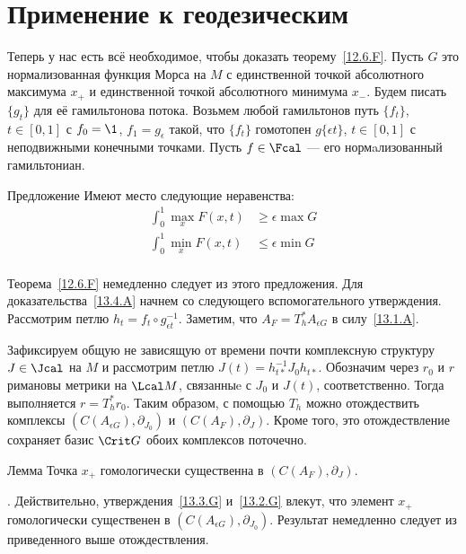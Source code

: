 \section{Применение к геодезическим}\label{sec:13.4}
Теперь у нас есть всё необходимое, чтобы доказать теорему~\ref{12.6.F}.
Пусть $G$ это нормализованная функция Морса на $M$ с единственной точкой абсолютного максимума $x_{+}$ и единственной точкой абсолютного минимума $x_{-}$.
Будем писать $\{g_{t}\}$ для её гамильтонова потока.
Возьмем любой гамильтонов путь $\{f_{t}\}$, $t\in[0,1]$ с $f_{0}=\1$,
$f_{1}=g_{\epsilon}$ такой, что $\{f_{t}\}$ гомотопен $g\{\epsilon
t\}$, $t\in[0,1]$ с неподвижными конечными точками.
Пусть $f\in\Fcal$ --- его нормaлизованный гамильтониан.
\begin{thm}{Предложение}\label{13.4.A}
  Имеют место следующие неравенства:
  \begin{align*}
    \int_{0}^{1}\max_{x}F(x,t) &\geq \epsilon\max G\\
    \int_{0}^{1}\min_{x}F(x,t) &\leq \epsilon\min G\\
  \end{align*}
\end{thm}
Теорема~\ref{12.6.F} немедленно следует из этого предложения.
Для доказательства~\ref{13.4.A} начнем со следующего вспомогательного утверждения.
Рассмотрим петлю $h_{t} = f_{t} \circ g_{\epsilon t}^{-1}$.
Заметим, что $A_{F} = T_{h}^{*}A_{\epsilon G}$ в силу~\ref{13.1.A}.

Зафиксируем общую не зависящую от времени почти комплексную структуру
$J\in\Jcal$ на $M$ и рассмотрим петлю $J(t) = h_{t*}^{-1}
J_{0}h_{t*}$. 
Обозначим через $r_{0}$ и $r$ римановы метрики на $\Lcal M$, связанныe
с $J_{0}$ и $J(t)$, соответственно. 
Тогда выполняется $r = T_{h}^{*}r_{0}$.
Таким образом, с помощью $T_{h}$ можно отождествить комплексы
$(C(A_{\epsilon G}), \partial_{J_{0}})$ и $(C(A_{F}), \partial_{J})$.
Кроме того, это отождествление сохраняет базис $\Crit G$ обоих
комплексов поточечно.

\begin{thm}{Лемма}\label{13.4.B}
  Точка $x_{+}$ гомологически существенна в $(C(A_{F}), \partial_{J})$.  
\end{thm}

\noindent{}.
Действительно, утверждения~\ref{13.3.G} и~\ref{13.2.G} влекут, что
элемент $x_{+}$ гомологически существенен в $(C(A_{\epsilon G}), \partial_{J_{0}})$. 
Результат немедленно следует из приведенного выше отождествления.
\qeds

